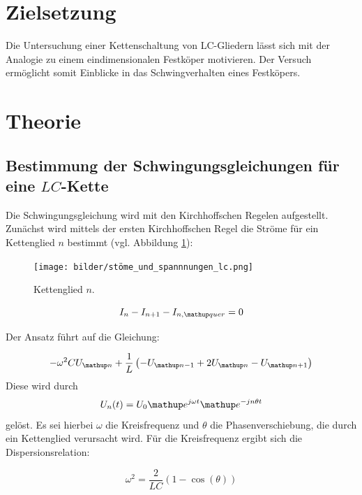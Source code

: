 \setcounter{page}{1}
\section*{Zielsetzung}
Die Untersuchung einer Kettenschaltung von LC-Gliedern lässt sich mit der Analogie
zu einem eindimensionalen Festköper motivieren.
Der Versuch ermöglicht somit Einblicke in das Schwingverhalten eines
Festköpers. %

\section{Theorie}

\subsection{Bestimmung der Schwingungsgleichungen für eine $LC$-Kette} %
Die Schwingungsgleichung wird mit den Kirchhoffschen Regelen aufgestellt. %
Zunächst wird mittels der ersten Kirchhoffschen Regel die Ströme für ein Kettenglied $n$ %
bestimmt (vgl. Abbildung \ref{fig:kettenglied}):

\begin{figure}
  \centering
  \texttt{[image: bilder/stöme\_und\_spannnungen\_lc.png]}
  \caption{Kettenglied $n$.\cite{anleitung356}} %
  \label{fig:kettenglied}
\end{figure}

\begin{equation}
\label{eq:kircheins_lc}
I_n-I_{n+1}-I_{n,\map{quer}}=0
\end{equation}

Der Ansatz führt auf die Gleichung:

\begin{equation}
\label{eq:gleichung_lc}
-\omega^2CU\ua{n}+\frac{1}{L}\left(-U\ua{n-1}+2U\ua{n}-U\ua{n+1}\right)
\end{equation}
Diese wird durch
\begin{equation}
\label{eq:loesung_gleichung_lc}
U_n(t)=U_0 \map{e}^{j\omega t} \map{e}^{-jn\theta t}
\end{equation}
gelöst.
Es sei hierbei $\omega$ die Kreisfrequenz und $\theta$ die Phasenverschiebung, %
die durch ein Kettenglied verursacht wird.
Für die Kreisfrequenz ergibt sich die Dispersionsrelation:

\begin{equation}
\label{eq:kreisfrequenz_lc_glied}
\omega^2=\frac{2}{LC}\left(1-\cos(\theta)\right)
\end{equation}

